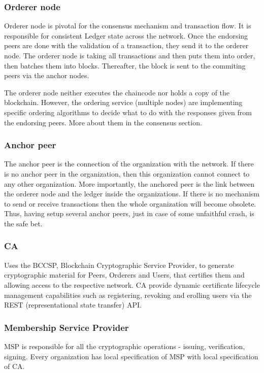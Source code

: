 \documentclass[a4paper,11pt]{report}
\begin{document}
\subsubsection{Orderer node}
Orderer node is pivotal for the consensus mechanism and transaction flow. It is responsible for consistent Ledger state across the network. Once the endorsing peers are done with the validation of a transaction, they send it to the orderer node. The orderer node is taking all transactions and then puts them into order, then batches them into blocks. Thereafter, the block is sent to the commiting peers via the anchor nodes.

	The orderer node neither executes the chaincode nor holds a copy of the blockchain. However, the ordering service (multiple nodes) are implementing specific ordering algorithms to decide what to do with the responses given from the endorsing peers. More about them in the consensus section.
\subsubsection{Anchor peer}
The anchor peer is the connection of the organization with the network. If there is no anchor peer in the organization, then this organization cannot connect to any other organization. More importantly, the anchored peer is the link between the orderer node and the ledger inside the organizations. If there is no mechanism to send or receive transactions then the whole organization will become obsolete. Thus, having setup several anchor peers, just in case of some unfaithful crash, is the safe bet.  

 
\subsubsection{CA}

Uses the BCCSP, Blockchain Cryptographic Service Provider, to generate cryptographic material for Peers, Orderers and Users, that certifies them and allowing access to the respective network. CA provide dynamic certificate lifecycle management capabilities such as registering, revoking and erolling users via the REST (representational state transfer) API.\cite{mencias2018optimized}

\subsubsection{Membership Service Provider}

MSP is responsible for all the cryptographic operations - issuing, verification, signing. Every organization has local specification of MSP with local specification of CA. 
\end{document}
